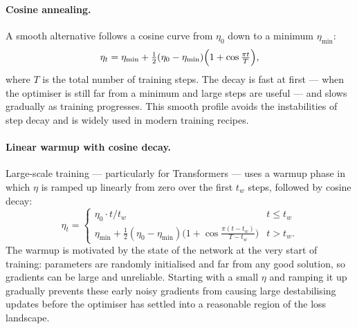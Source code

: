 \paragraph{Cosine annealing.} A smooth alternative follows a cosine curve from $\eta_0$ down to a minimum $\eta_{\min}$:
\begin{equation}
    \eta_t = \eta_{\min} + \tfrac{1}{2}(\eta_0 - \eta_{\min})\Bigl(1 + \cos\tfrac{\pi t}{T}\Bigr),
\end{equation}
where $T$ is the total number of training steps. The decay is fast at first — when the optimiser is still far from a minimum and large steps are useful — and slows gradually as training progresses. This smooth profile avoids the instabilities of step decay and is widely used in modern training recipes.

\paragraph{Linear warmup with cosine decay.} Large-scale training — particularly for Transformers — uses a warmup phase in which $\eta$ is ramped up linearly from zero over the first $t_w$ steps, followed by cosine decay:
\begin{equation}
    \eta_t = \begin{cases} \eta_0 \cdot t/t_w & t \leq t_w \\ \eta_{\min} + \tfrac{1}{2}(\eta_0 - \eta_{\min})\bigl(1 + \cos\tfrac{\pi(t-t_w)}{T-t_w}\bigr) & t > t_w. \end{cases}
\end{equation}
The warmup is motivated by the state of the network at the very start of training: parameters are randomly initialised and far from any good solution, so gradients can be large and unreliable. Starting with a small $\eta$ and ramping it up gradually prevents these early noisy gradients from causing large destabilising updates before the optimiser has settled into a reasonable region of the loss landscape.
